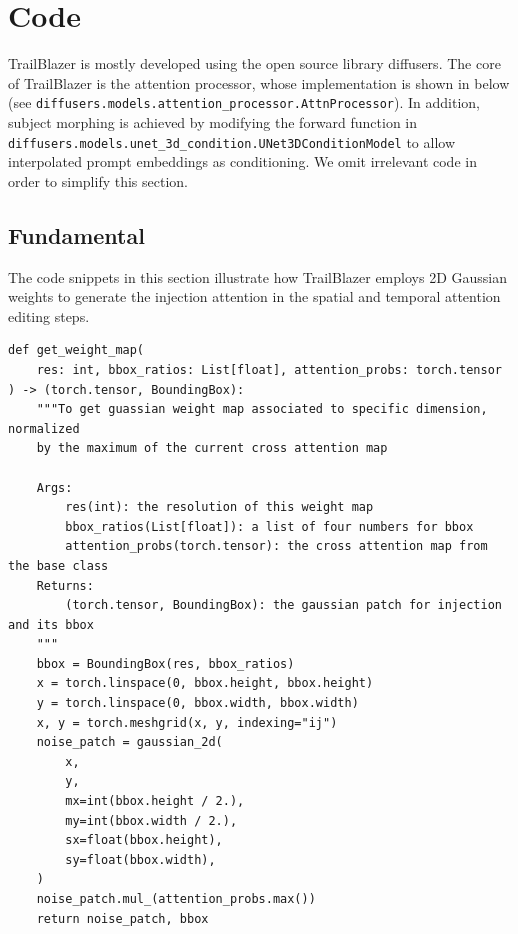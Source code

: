 \newpage
\section{Code}

TrailBlazer is mostly developed using the open source library \textsf{diffusers}. The core of TrailBlazer is the attention processor, whose implementation is shown in  below (see  \texttt{diffusers.models.attention\_processor.AttnProcessor}). In addition,  subject morphing is achieved by modifying the forward function in \texttt{diffusers.models.unet\_3d\_condition.UNet3DConditionModel} to allow interpolated prompt embeddings as conditioning. We omit irrelevant code in order to simplify this section.

\subsection{Fundamental}
\label{sec:fund}
The code snippets in this section illustrate how TrailBlazer employs 2D Gaussian weights to generate the injection attention in the spatial and temporal attention editing steps.


\begin{tiny}
\begin{verbatim}
def get_weight_map(
    res: int, bbox_ratios: List[float], attention_probs: torch.tensor
) -> (torch.tensor, BoundingBox):
    """To get guassian weight map associated to specific dimension, normalized
    by the maximum of the current cross attention map

    Args:
        res(int): the resolution of this weight map
        bbox_ratios(List[float]): a list of four numbers for bbox
        attention_probs(torch.tensor): the cross attention map from the base class
    Returns:
        (torch.tensor, BoundingBox): the gaussian patch for injection and its bbox
    """
    bbox = BoundingBox(res, bbox_ratios)
    x = torch.linspace(0, bbox.height, bbox.height)
    y = torch.linspace(0, bbox.width, bbox.width)
    x, y = torch.meshgrid(x, y, indexing="ij")
    noise_patch = gaussian_2d(
        x,
        y,
        mx=int(bbox.height / 2.),
        my=int(bbox.width / 2.),
        sx=float(bbox.height),
        sy=float(bbox.width),
    )
    noise_patch.mul_(attention_probs.max())
    return noise_patch, bbox

\end{verbatim}
\end{tiny}



